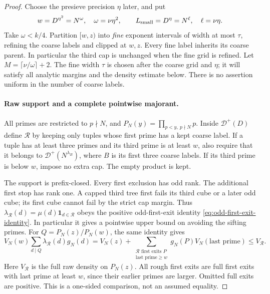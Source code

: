 \documentclass[11pt]{article}
\begin{document}
\begin{proof}
Choose the presieve precision $\eta$ later, and put
\[
 w=D^{\eta^2}=N^\omega,\quad \omega=\nu\eta^2,
 \qquad L_{\rm small}=D^\eta=N^\ell,\quad \ell=\nu\eta.
\]
Take $\omega<k/4$. Partition $[w,z)$ into \emph{fine} exponent
intervals of width at most $\tau$, refining the coarse labels and
clipped at $w,z$. Every fine label inherits its coarse parent.
In particular the third cap is unchanged when the fine grid is
refined. Let $M=\lceil\nu/\omega\rceil+2$.
The fine width $\tau$ is chosen after the coarse grid and $\eta$;
it will satisfy all analytic margins and the density estimate below.
There is no assertion uniform in the number of coarse labels.

\paragraph{Raw support and a complete pointwise majorant.}
All primes are restricted to $p\nmid N$, and
$P_N(y)=\prod_{p<y,\ p\nmid N}p$.
Inside $\mathcal D^+(D)$ define $\mathcal R$ by keeping only
tuples whose first prime has a kept coarse label. If a tuple has
at least three primes and its third prime is at least $w$, also
require that it belongs to $\mathcal D^+(N^{\lambda_B})$,
where $B$ is its first three coarse labels. If its third prime is
below $w$, impose no extra cap. The empty product is kept.

The support is prefix-closed. Every first exclusion has odd rank.
The additional first stop has rank one. A capped third tree first
fails its third cube or a later odd cube; its first cube cannot fail
by the strict cap margin. Thus
$\lambda_{\mathcal R}(d)=\mu(d)\mathbf1_{d\in\mathcal R}$ obeys
the positive odd-first-exit identity
\eqref{eq:odd-first-exit-identity}. In particular it gives a pointwise
upper bound on avoiding the sifting primes.
For $Q=P_N(z)/P_N(w)$, the same identity gives
\begin{equation}\label{eq:variable-prefix-rough-density}
 V_N(w)\sum_{d\mid Q}\lambda_{\mathcal R}(d)g_N(d)
 =V_N(z)+\sum_{\substack{\mathcal R\text{ first exits }P\\
                         \text{last prime}\ge w}}
                   g_N(P)V_N(\text{last prime})
 \le V_{\mathcal R}.
\end{equation}
Here $V_{\mathcal R}$ is the full raw density on $P_N(z)$.
All rough first exits are full first exits with last prime at least
$w$, since their earlier primes are larger. Omitted full exits are
positive. This is a one-sided comparison, not an assumed equality.


\end{proof}
\end{document}
